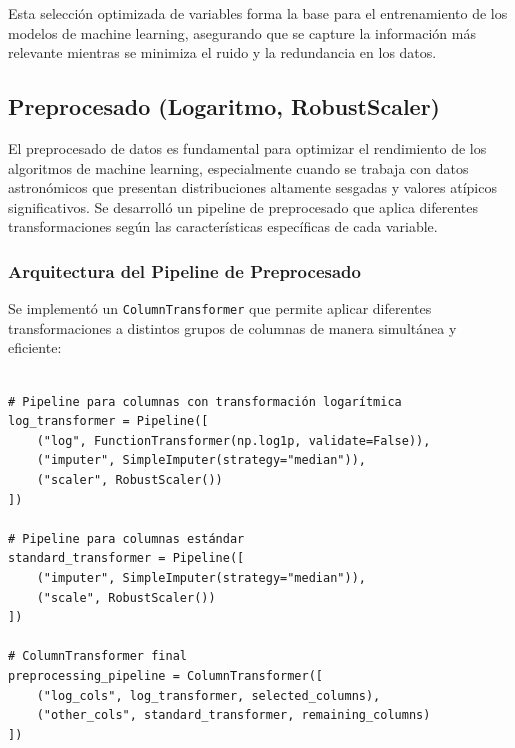 \documentclass{article}
\begin{document}

Esta selección optimizada de variables forma la base para el entrenamiento de los modelos de machine learning, asegurando que se capture la información más relevante mientras se minimiza el ruido y la redundancia en los datos.

\subsection{Preprocesado (Logaritmo, RobustScaler)}

El preprocesado de datos es fundamental para optimizar el rendimiento de los algoritmos de machine learning, especialmente cuando se trabaja con datos astronómicos que presentan distribuciones altamente sesgadas y valores atípicos significativos. Se desarrolló un pipeline de preprocesado que aplica diferentes transformaciones según las características específicas de cada variable.

\subsubsection{Arquitectura del Pipeline de Preprocesado}

Se implementó un \texttt{ColumnTransformer} que permite aplicar diferentes transformaciones a distintos grupos de columnas de manera simultánea y eficiente:

\begin{verbatim}

# Pipeline para columnas con transformación logarítmica
log_transformer = Pipeline([
    ("log", FunctionTransformer(np.log1p, validate=False)),
    ("imputer", SimpleImputer(strategy="median")),
    ("scaler", RobustScaler())
])

# Pipeline para columnas estándar
standard_transformer = Pipeline([
    ("imputer", SimpleImputer(strategy="median")),
    ("scale", RobustScaler())
])

# ColumnTransformer final
preprocessing_pipeline = ColumnTransformer([
    ("log_cols", log_transformer, selected_columns),
    ("other_cols", standard_transformer, remaining_columns)
])
\end{verbatim}
\end{document}

